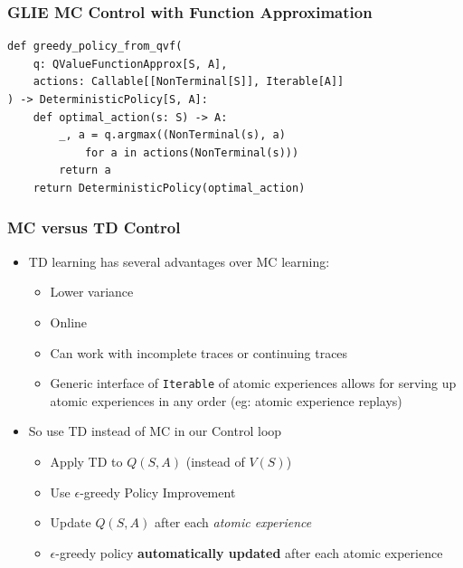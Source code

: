 \documentclass[handout]{beamer}
\begin{document}
\begin{frame}[fragile]
\frametitle{GLIE MC Control with Function Approximation}
\pause
\begin{lstlisting}
def greedy_policy_from_qvf(
    q: QValueFunctionApprox[S, A],
    actions: Callable[[NonTerminal[S]], Iterable[A]]
) -> DeterministicPolicy[S, A]:
    def optimal_action(s: S) -> A:
        _, a = q.argmax((NonTerminal(s), a)
            for a in actions(NonTerminal(s)))
        return a
    return DeterministicPolicy(optimal_action)
\end{lstlisting}    
\end{frame}




\begin{frame}
\frametitle{MC versus TD Control}
\pause
\begin{itemize}[<+->]
\item TD learning has several advantages over MC learning:
\begin{itemize}[<+->]
\item Lower variance
\item Online
\item Can work with incomplete traces or continuing traces
\item Generic interface of \lstinline{Iterable} of atomic experiences allows for serving up atomic experiences in any order (eg: atomic experience replays)
\end{itemize}
\pause
\item So use TD instead of MC in our Control loop
\pause
\begin{itemize}[<+->]
\item Apply TD to $Q(S,A)$ (instead of $V(S)$)
\item Use $\epsilon$-greedy Policy Improvement
\item Update $Q(S,A)$ after each {\em atomic experience}
\item $\epsilon$-greedy policy {\bf automatically updated} after each atomic experience
\end{itemize}
\end{itemize}
\end{frame}
\end{document}
